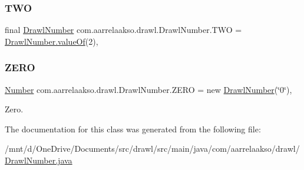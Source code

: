 \subsubsection{\texorpdfstring{T\+WO}{TWO}}
{\footnotesize\ttfamily final \hyperlink{classcom_1_1aarrelaakso_1_1drawl_1_1_drawl_number}{Drawl\+Number} com.\+aarrelaakso.\+drawl.\+Drawl\+Number.\+T\+WO = \hyperlink{classcom_1_1aarrelaakso_1_1drawl_1_1_drawl_number_a368da87af7b1b38bd5185715afadcad6}{Drawl\+Number.\+value\+Of}(2)\hspace{0.3cm}{\ttfamily [static]}, {\ttfamily [protected]}}

\mbox{\label{classcom_1_1aarrelaakso_1_1drawl_1_1_drawl_number_ae79e88954ed30a7f939cc62836fdc75c}} 
\subsubsection{\texorpdfstring{Z\+E\+RO}{ZERO}}
{\footnotesize\ttfamily \hyperlink{interfacecom_1_1aarrelaakso_1_1drawl_1_1_number}{Number} com.\+aarrelaakso.\+drawl.\+Drawl\+Number.\+Z\+E\+RO = new \hyperlink{classcom_1_1aarrelaakso_1_1drawl_1_1_drawl_number}{Drawl\+Number}(\char`\"{}0\char`\"{})\hspace{0.3cm}{\ttfamily [static]}, {\ttfamily [protected]}}



Zero. 



The documentation for this class was generated from the following file\+:\begin{DoxyCompactItemize}
\item 
/mnt/d/\+One\+Drive/\+Documents/src/drawl/src/main/java/com/aarrelaakso/drawl/\hyperlink{_drawl_number_8java}{Drawl\+Number.\+java}\end{DoxyCompactItemize}
